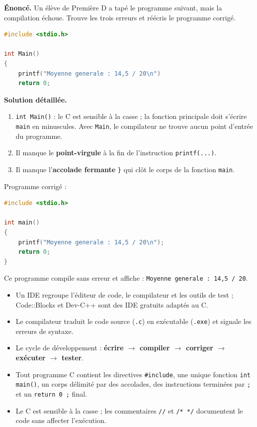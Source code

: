\documentclass[11pt]{article}
\newcommand{\cle}[1]{{\popxbold\color{popdark}#1}}
\begin{document}
\begin{exoresolu}
\textbf{Énoncé.} Un élève de Première D a tapé le programme suivant, mais la compilation échoue. Trouve les trois erreurs et réécris le programme corrigé.
\begin{lstlisting}[language=C]
#include <stdio.h>

int Main()
{
    printf("Moyenne generale : 14,5 / 20\n")
    return 0;
\end{lstlisting}
\tcblower
\textbf{Solution détaillée.}
\begin{enumerate}
\item \texttt{int Main()} : le C est sensible à la casse ; la fonction principale doit s'écrire \texttt{main} en minuscules. Avec \texttt{Main}, le compilateur ne trouve aucun point d'entrée du programme.
\item Il manque le \textbf{point-virgule} à la fin de l'instruction \texttt{printf(...)}.
\item Il manque l'\textbf{accolade fermante} \texttt{\}} qui clôt le corps de la fonction \texttt{main}.
\end{enumerate}
Programme corrigé :
\begin{lstlisting}[language=C]
#include <stdio.h>

int main()
{
    printf("Moyenne generale : 14,5 / 20\n");
    return 0;
}
\end{lstlisting}
Ce programme compile sans erreur et affiche : \texttt{Moyenne generale : 14,5 / 20}.
\end{exoresolu}

\begin{aretenir}
\begin{itemize}
\item Un \cle{IDE} regroupe l'éditeur de code, le compilateur et les outils de test ; Code::Blocks et Dev-C++ sont des IDE gratuits adaptés au C.
\item Le \cle{compilateur} traduit le code source (\texttt{.c}) en exécutable (\texttt{.exe}) et signale les erreurs de syntaxe.
\item Le cycle de développement : \textbf{écrire $\rightarrow$ compiler $\rightarrow$ corriger $\rightarrow$ exécuter $\rightarrow$ tester}.
\item Tout programme C contient les directives \texttt{\#include}, une unique fonction \texttt{int main()}, un corps délimité par des accolades, des instructions terminées par \texttt{;} et un \texttt{return 0 ;} final.
\item Le C est sensible à la casse ; les commentaires \texttt{//} et \texttt{/* */} documentent le code sans affecter l'exécution.
\end{itemize}
\end{aretenir}
\end{document}
